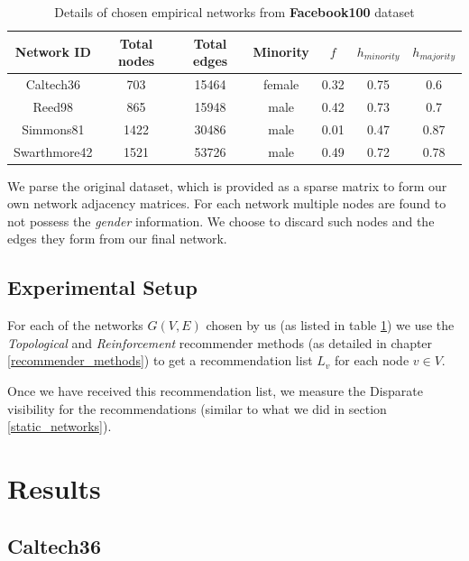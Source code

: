 \begin{table}[h]
	\centering
	\begin{tabular}{ |c|c|c|c|c|c|c| }
		\hline
		\textbf{Network ID} & \textbf{Total nodes} & \textbf{Total edges} & \textbf{Minority} & \textbf{$f$} & \textbf{$h_{minority}$} & \textbf{$h_{majority}$} \\
		\hline
		Caltech36 & 703 & 15464 & female & 0.32 & 0.75 & 0.6 \\
		Reed98 & 865 & 15948 & male & 0.42 & 0.73 & 0.7 \\
		Simmons81 & 1422 & 30486 & male & 0.01 & 0.47 & 0.87 \\
		Swarthmore42 & 1521 & 53726 & male & 0.49 & 0.72 & 0.78 \\
		\hline
	\end{tabular}
	\caption{Details of chosen empirical networks from \textbf{Facebook100} dataset}
	\label{table_facebook_datadet}
\end{table}

We parse the original dataset, which is provided as a sparse matrix to form our own network adjacency matrices. For each network multiple nodes are found to not possess the \textit{gender} information. We choose to discard such nodes and the edges they form from our final network. 

\subsection{Experimental Setup}

For each of the networks $G(V,E)$ chosen by us (as listed in table \ref{table_facebook_datadet}) we use the \textit{Topological} and \textit{Reinforcement} recommender methods (as detailed in chapter \ref{recommender_methods}) to get a recommendation list $L_{v}$ for each node $v \in V$.

Once we have received this recommendation list, we measure the Disparate visibility \cite{fabbri2020effect} for the recommendations (similar to what we did in section \ref{static_networks}). 

\section{Results}

\subsection{Caltech36}


